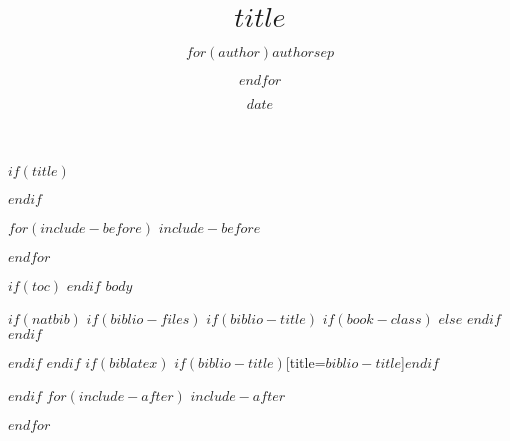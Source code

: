 \documentclass[$if(fontsize)$$fontsize$,$endif$$if(lang)$$lang$,$endif$,openany,oneside,a4paper]{$documentclass$}
\title{$title$}
\author{$for(author)$$author$$sep$ \and $endfor$}
\date{$date$}
\begin{document}
$if(title)$
\maketitle
$endif$

$for(include-before)$
$include-before$

$endfor$

\newpage

$if(toc)$
{
\hypersetup{linkcolor=black}
\setcounter{tocdepth}{$toc-depth$}
\tableofcontents
}
$endif$
$body$

$if(natbib)$
$if(biblio-files)$
$if(biblio-title)$
$if(book-class)$
\renewcommand\bibname{$biblio-title$}
$else$
\renewcommand\refname{$biblio-title$}
$endif$
$endif$


$endif$
$endif$
$if(biblatex)$
\printbibliography$if(biblio-title)$[title=$biblio-title$]$endif$

$endif$
$for(include-after)$
$include-after$

$endfor$


\end{document}
